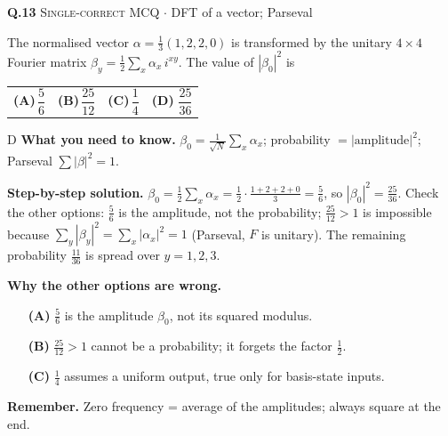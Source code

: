 \documentclass[11pt,a4paper]{article}
\newcommand{\optlabel}[1]{\textbf{(#1)}}
\newcommand{\correctlabel}[1]{\textcolor{okgreen}{\textbf{(#1)}\,\ding{51}}}
\newenvironment{qitem}[1]{\begin{list}{}{\setlength{\leftmargin}{3.3em}\setlength{\labelwidth}{3.1em}%
  \setlength{\labelsep}{0.2em}\setlength{\topsep}{3pt}\setlength{\parsep}{3pt}}\item[\textbf{Q.#1}\hfill]}{\end{list}}
\newcommand{\qsep}{\par\vspace{2pt}{\color{black!15}\hrule}\vspace{4pt}}
\newcommand{\qmeta}[2]{{\footnotesize\color{black!60}\textsc{#1} \;$\cdot$\; #2}\par}
\begin{document}
\begin{qitem}{13}
\qmeta{Single-correct MCQ}{DFT of a vector; Parseval}
The normalised vector $\alpha = \frac13(1, 2, 2, 0)$ is transformed by the unitary $4\times4$ Fourier matrix
$\beta_y = \frac12\sum_{x}\alpha_x\, i^{xy}$. The value of $|\beta_0|^2$ is
\par\smallskip\noindent\begin{tabularx}{\linewidth}{@{}*{4}{L}@{}}
\optlabel{A}\,$\dfrac56$ & \optlabel{B}\,$\dfrac{25}{12}$ & \optlabel{C}\,$\dfrac14$ & \correctlabel{D}\,$\dfrac{25}{36}$
\end{tabularx}
\end{qitem}
\begin{solbox}{D}
\textbf{\color{brand}What you need to know.} $\beta_0 = \frac{1}{\sqrt N}\sum_x\alpha_x$; probability $= |\text{amplitude}|^2$; Parseval $\sum|\beta|^2 = 1$.

\textbf{\color{brand}Step-by-step solution.} $\beta_0 = \frac12\sum_x \alpha_x = \frac12\cdot\frac{1+2+2+0}{3} = \frac56$, so $|\beta_0|^2 = \frac{25}{36}$.
Check the other options: $\frac56$ is the amplitude, not the probability; $\frac{25}{12} > 1$ is impossible because
$\sum_y|\beta_y|^2 = \sum_x|\alpha_x|^2 = 1$ (Parseval, $F$ is unitary). The remaining probability $\frac{11}{36}$ is spread over $y = 1,2,3$.

\textbf{\color{brand}Why the other options are wrong.}
\begin{itemize}[leftmargin=2.4em, itemsep=1pt, topsep=2pt]
\item[\textbf{(A)}] $\frac56$ is the amplitude $\beta_0$, not its squared modulus.
\item[\textbf{(B)}] $\frac{25}{12} > 1$ cannot be a probability; it forgets the factor $\frac12$.
\item[\textbf{(C)}] $\frac14$ assumes a uniform output, true only for basis-state inputs.
\end{itemize}
\textbf{\color{brand}Remember.} Zero frequency = average of the amplitudes; always square at the end.
\end{solbox}
\qsep
\end{document}
